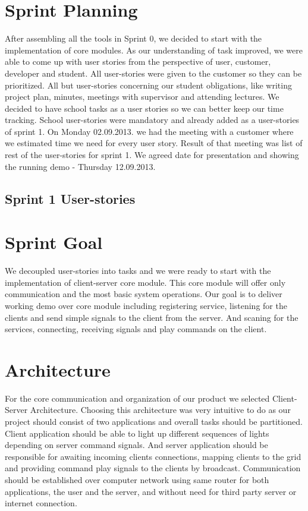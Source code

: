 \section{Sprint Planning}
After assembling all the tools in Sprint 0, we decided to start with the implementation of core modules.
As our understanding of task improved, we were able to come up with user stories from the perspective of user, customer, developer and student.
All user-stories were given to the customer so they can be prioritized. 
All but user-stories concerning our student obligations, like writing project plan, minutes, meetings with supervisor and attending lectures.
We decided to have school tasks as a user stories so we can better keep our time tracking. 
School user-stories were mandatory and already added as a user-stories of sprint 1.
On Monday 02.09.2013. we had the meeting with a customer where we estimated time we need for every user story.
Result of that meeting was list of rest of the user-stories for sprint 1.
We agreed date for presentation and showing the running demo - Thursday 12.09.2013.

\subsection{Sprint 1 User-stories}


\section{Sprint Goal}
We decoupled user-stories into tasks and we were ready to start with the implementation of client-server core module.
This core module will offer only communication and the most basic system operations. 
Our goal is to deliver working demo over core module including registering service, listening for the clients and send simple signals to the client from the server.
And scaning for the services, connecting, receiving signals and play commands on the client. 

\section{Architecture}

For the core communication and organization of our product we selected Client-Server Architecture.
Choosing this architecture was very intuitive to do as our project should consist of two applications and overall tasks should be partitioned. 
Client application should be able to light up different sequences of lights depending on server command signals.
And server application should be responsible for awaiting incoming clients connections, mapping clients to the grid and providing command play signals to the clients by broadcast.
Communication should be established over computer network using same router for both applications, the user and the server, and without need for third party server or internet connection. 


